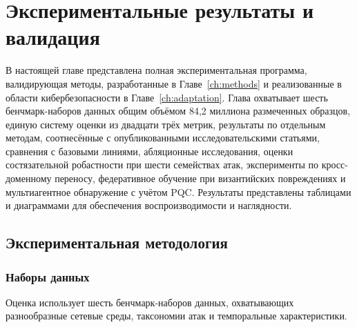 
\chapter{Экспериментальные результаты и валидация}
\label{ch:experiments}

В настоящей главе представлена полная экспериментальная программа, валидирующая методы, разработанные в Главе~\ref{ch:methods} и реализованные в области кибербезопасности в Главе~\ref{ch:adaptation}. Глава охватывает шесть бенчмарк-наборов данных общим объёмом 84,2 миллиона размеченных образцов, единую систему оценки из двадцати трёх метрик, результаты по отдельным методам, соотнесённые с опубликованными исследовательскими статьями, сравнения с базовыми линиями, абляционные исследования, оценки состязательной робастности при шести семействах атак, эксперименты по кросс-доменному переносу, федеративное обучение при византийских повреждениях и мультиагентное обнаружение с учётом PQC. Результаты представлены таблицами и диаграммами для обеспечения воспроизводимости и наглядности.


\section{Экспериментальная методология}
\label{sec:exp_methodology}

\subsection{Наборы данных}

Оценка использует шесть бенчмарк-наборов данных, охватывающих разнообразные сетевые среды, таксономии атак и темпоральные характеристики.

